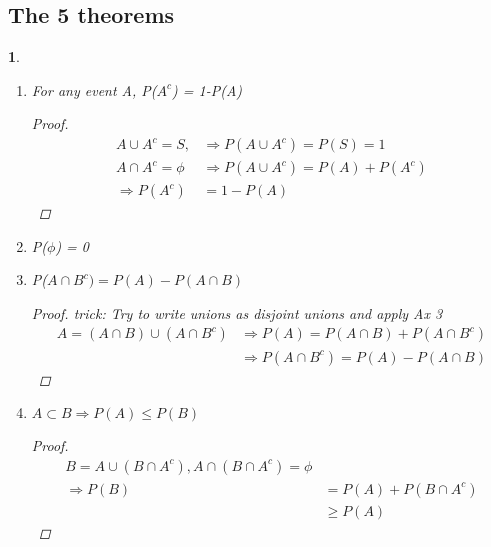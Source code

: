 \documentclass[11pt]{article}
\newtheorem{theorem}{\framebox{Thm}}[section]
\begin{document}
        \subsection{The 5 theorems}
            \begin{theorem}
                \begin{enumerate}
                    \item For any event A, P($A^c$) = 1-P(A)
                        \begin{proof}
                            \begin{align*}
                                 A \cup A^c = S,&\Rightarrow P(A\cup A^c) = P(S) = 1 \tag{Ax 2} \\
                                 A \cap A^c = \phi &\Rightarrow P(A \cup A^c) = P(A) + P(A^c) \tag{Ax 3}\\
                                 \Rightarrow P(A^c) &= 1 - P(A)
                            \end{align*}
                        \end{proof}
                    \item P($\phi$) = 0 
                    \item P($A \cap B^c) = P(A) - P(A \cap B )$
                        \begin{proof}
                            trick: Try to write unions as disjoint unions and apply Ax 3
                            \begin{align*}
                                A = (A\cap B) \cup (A\cap B^c)  &\Rightarrow P(A) = P(A\cap B)+P(A\cap B^c) \tag{Ax 3}\\
                                                                &\Rightarrow P(A\cap B^c) = P(A) - P(A \cap B)
                            \end{align*}
                        \end{proof}
                    \item  $A\subset B \Rightarrow P(A) \leq P(B)$
                        \begin{proof}
                            \begin{align*}
                                B = A \cup (B \cap A^c) , 
                                 A \cap (B\cap A^c) =\phi\\
                                \Rightarrow P(B)    &= P(A) + P(B \cap A^c) \\
                                                    &\geq P(A) \tag{Ax 1}
                            \end{align*}

\end{proof}
\end{enumerate}
\end{theorem}
\end{document}
